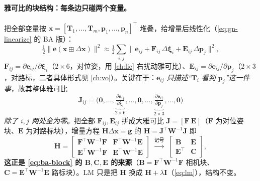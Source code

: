 \paragraph{雅可比的块结构：每条边只碰两个变量。}\cite{gaoxiang2019slam14}
把全部变量按 $\mathbf{x}=[\mathbf{T}_1,\dots,\mathbf{T}_m,\mathbf{p}_1,\dots,\mathbf{p}_n]^\top$ 堆叠，给增量后线性化（\cref{eq:gn-linearize} 的 BA 版）：
\begin{equation}
  \tfrac12\|\mathbf{e}(\mathbf{x}\boxplus\Delta\mathbf{x})\|^2\approx\tfrac12\sum_{i,j}\big\|\mathbf{e}_{ij}+\mathbf{F}_{ij}\,\Delta\boldsymbol{\xi}_i+\mathbf{E}_{ij}\,\Delta\mathbf{p}_j\big\|^2,
  \label{eq:nlopt-ba-lin}
\end{equation}
$\mathbf{F}_{ij}=\partial\mathbf{e}_{ij}/\partial\boldsymbol{\xi}_i$（$2\times6$，对位姿，用 \cref{ch:lie} 右扰动雅可比）、$\mathbf{E}_{ij}=\partial\mathbf{e}_{ij}/\partial\mathbf{p}_j$（$2\times3$，对路标，二者具体形式见 \cref{ch:vo}）。关键在于：\emph{$\mathbf{e}_{ij}$ 只描述“$\mathbf{T}_i$ 看到 $\mathbf{p}_j$”这一件事}，故其整体雅可比
\begin{equation}
  \mathbf{J}_{ij}=\Big(\mathbf{0},\dots,\underbrace{\tfrac{\partial\mathbf{e}_{ij}}{\partial\boldsymbol{\xi}_i}}_{2\times6},\dots,\mathbf{0},\dots,\underbrace{\tfrac{\partial\mathbf{e}_{ij}}{\partial\mathbf{p}_j}}_{2\times3},\dots,\mathbf{0}\Big)
  \label{eq:nlopt-ba-jij}
\end{equation}
\emph{除了 $i,j$ 两处全为零}。把全部 $\mathbf{F}_{ij},\mathbf{E}_{ij}$ 拼成大雅可比 $\mathbf{J}=[\mathbf{F}\ \mathbf{E}]$（$\mathbf{F}$ 为对位姿块、$\mathbf{E}$ 为对路标块），增量方程 $\mathbf{H}\Delta\mathbf{x}=\mathbf{g}$ 的 $\mathbf{H}=\mathbf{J}^\top\mathbf{W}^{-1}\mathbf{J}$ 即
\begin{equation}
  \mathbf{H}=\begin{bmatrix}\mathbf{F}^\top\mathbf{W}^{-1}\mathbf{F}&\mathbf{F}^\top\mathbf{W}^{-1}\mathbf{E}\\\mathbf{E}^\top\mathbf{W}^{-1}\mathbf{F}&\mathbf{E}^\top\mathbf{W}^{-1}\mathbf{E}\end{bmatrix}
  \;\xrightarrow{\text{记号}}\;\begin{bmatrix}\mathbf{B}&\mathbf{E}\\\mathbf{E}^\top&\mathbf{C}\end{bmatrix},
  \label{eq:nlopt-ba-H}
\end{equation}
\textbf{这正是 \cref{eq:ba-block} 的 $\mathbf{B},\mathbf{C},\mathbf{E}$ 的来源}（$\mathbf{B}=\mathbf{F}^\top\mathbf{W}^{-1}\mathbf{F}$ 相机块、$\mathbf{C}=\mathbf{E}^\top\mathbf{W}^{-1}\mathbf{E}$ 路标块）。LM 只是把 $\mathbf{H}$ 换成 $\mathbf{H}+\lambda\mathbf{I}$（\cref{eq:lm}），结构不变。

